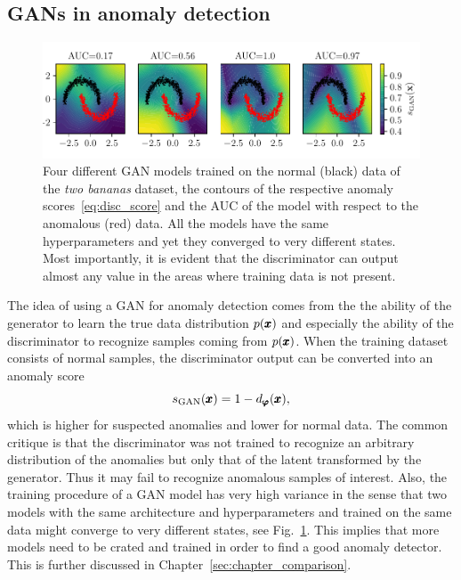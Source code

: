 \subsection{GANs in anomaly detection}
\begin{figure}
\begin{centering}
\includegraphics[scale=0.98]{data/chapter_survey/gan_examples.pdf}
\end{centering}
\caption{Four different GAN models trained on the normal (black) data of the \textit{two bananas} dataset, the contours of the respective anomaly scores~\eqref{eq:disc_score} and the AUC of the model with respect to the anomalous (red) data. All the models have the same hyperparameters and yet they converged to very different states. Most importantly, it is evident that the discriminator can output almost any value in the areas where training data is not present.}
\label{fig:gan_examples}
\end{figure}

The idea of using a GAN for anomaly detection comes from the the ability of the generator to learn the true data distribution $p(\pmb{{x}})$ and especially the ability of the discriminator to recognize samples coming from $p(\pmb{{x}})$. When the training dataset consists of normal samples, the discriminator output can be converted into an anomaly score
\begin{equation} \label{eq:disc_score}
     s_{\text{GAN}}(\pmb{{x}}) = 1 - d_{\pmb{{\varphi}}}(\pmb{{x}}),
\end{equation}
which is higher for suspected anomalies and lower for normal data. The common critique is that the discriminator was not trained to recognize an arbitrary distribution of the anomalies but only that of the latent transformed by the generator. Thus it may fail to recognize anomalous samples of interest. Also, the training procedure of a GAN model has very high variance in the sense that two models with the same architecture and hyperparameters and trained on the same data might converge to very different states, see Fig.~\ref{fig:gan_examples}. This implies that more models need to be crated and trained in order to find a good anomaly detector. This is further discussed in Chapter~\ref{sec:chapter_comparison}.

